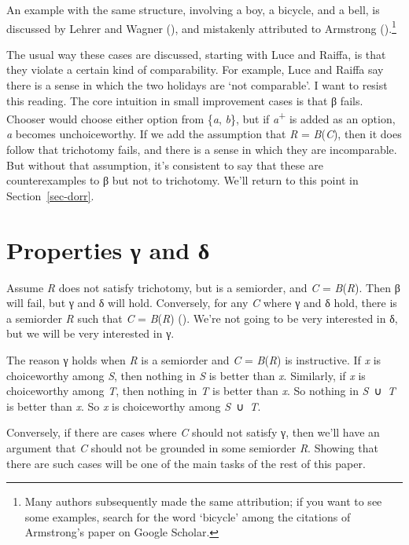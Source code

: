 \documentclass[
  11pt,
  letterpaper,
  DIV=11,
  numbers=noendperiod,
  twoside]{scrartcl}
\begin{document}
An example with the same structure, involving a boy, a bicycle, and a
bell, is discussed by Lehrer and Wagner
(), and mistakenly attributed to
Armstrong ().\footnote{Many authors
  subsequently made the same attribution; if you want to see some
  examples, search for the word `bicycle' among the citations of
  Armstrong's paper on Google Scholar.}

The usual way these cases are discussed, starting with Luce and Raiffa,
is that they violate a certain kind of comparability. For example, Luce
and Raiffa say there is a sense in which the two holidays are `not
comparable'. I want to resist this reading. The core intuition in small
improvement cases is that β fails. Chooser would choose either option
from \{\emph{a}, \emph{b}\}, but if \emph{a}\textsuperscript{+} is added
as an option, \emph{a} becomes unchoiceworthy. If we add the assumption
that \emph{R} = \emph{B}(\emph{C}), then it does follow that trichotomy
fails, and there is a sense in which they are incomparable. But without
that assumption, it's consistent to say that these are counterexamples
to β but not to trichotomy. We'll return to this point in
Section~\ref{sec-dorr}.

\section{Properties γ and δ}\label{sec-gamma}

Assume \emph{R} does not satisfy trichotomy, but is a semiorder, and
\emph{C} = \emph{B}(\emph{R}). Then β will fail, but γ and δ will hold.
Conversely, for any \emph{C} where γ and δ hold, there is a semiorder
\emph{R} such that \emph{C} = \emph{B}(\emph{R})
(). We're not going
to be very interested in δ, but we will be very interested in γ.

The reason γ holds when \emph{R} is a semiorder and \emph{C} =
\emph{B}(\emph{R}) is instructive. If \emph{x} is choiceworthy among
\emph{S}, then nothing in \emph{S} is better than \emph{x}. Similarly,
if \emph{x} is choiceworthy among \emph{T}, then nothing in \emph{T} is
better than \emph{x}. So nothing in \emph{S}~∪~\emph{T} is better than
\emph{x}. So \emph{x} is choiceworthy among \emph{S}~∪~\emph{T}.

Conversely, if there are cases where \emph{C} should not satisfy γ, then
we'll have an argument that \emph{C} should not be grounded in some
semiorder \emph{R}. Showing that there are such cases will be one of the
main tasks of the rest of this paper.
\end{document}

